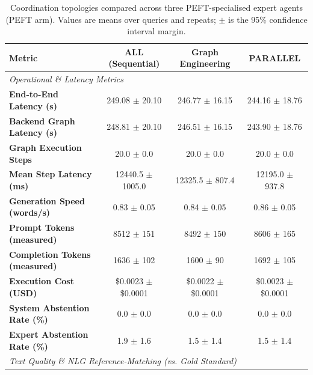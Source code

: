\begin{table}[t]
\centering
\caption{Coordination topologies compared across three PEFT-specialised expert agents (PEFT arm). Values are means over queries and repeats; $\pm$ is the 95\% confidence interval margin.}
\label{tab:agent_workflows_eval}
\small
\begin{tabular}{lccc}
\toprule
\textbf{Metric} & \textbf{ALL (Sequential)} & \textbf{Graph Engineering} & \textbf{PARALLEL} \\
\midrule
\multicolumn{4}{l}{\textit{Operational \& Latency Metrics}} \\
\textbf{End-to-End Latency (s)} & 249.08 $\pm$ 20.10 & 246.77 $\pm$ 16.15 & 244.16 $\pm$ 18.76 \\
\textbf{Backend Graph Latency (s)} & 248.81 $\pm$ 20.10 & 246.51 $\pm$ 16.15 & 243.90 $\pm$ 18.76 \\
\textbf{Graph Execution Steps} & 20.0 $\pm$ 0.0 & 20.0 $\pm$ 0.0 & 20.0 $\pm$ 0.0 \\
\textbf{Mean Step Latency (ms)} & 12440.5 $\pm$ 1005.0 & 12325.5 $\pm$ 807.4 & 12195.0 $\pm$ 937.8 \\
\textbf{Generation Speed (words/s)} & 0.83 $\pm$ 0.05 & 0.84 $\pm$ 0.05 & 0.86 $\pm$ 0.05 \\
\textbf{Prompt Tokens (measured)} & 8512 $\pm$ 151 & 8492 $\pm$ 150 & 8606 $\pm$ 165 \\
\textbf{Completion Tokens (measured)} & 1636 $\pm$ 102 & 1600 $\pm$ 90 & 1692 $\pm$ 105 \\
\textbf{Execution Cost (USD)} & \$0.0023 $\pm$ \$0.0001 & \$0.0022 $\pm$ \$0.0001 & \$0.0023 $\pm$ \$0.0001 \\
\textbf{System Abstention Rate (\%)} & 0.0 $\pm$ 0.0 & 0.0 $\pm$ 0.0 & 0.0 $\pm$ 0.0 \\
\textbf{Expert Abstention Rate (\%)} & 1.9 $\pm$ 1.6 & 1.5 $\pm$ 1.4 & 1.5 $\pm$ 1.4 \\
\midrule
\multicolumn{4}{l}{\textit{Text Quality \& NLG Reference-Matching (vs. Gold Standard)}} \\

\end{tabular}
\end{table}
